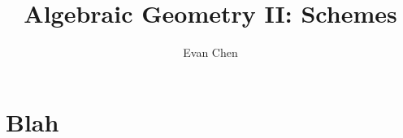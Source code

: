 \documentclass[11pt]{scrreprt}
\begin{document}
\title{Algebraic Geometry II: Schemes}
\author{Evan Chen}
\maketitle

\tableofcontents

\section{Blah}
\label{thm:reg_func_distinguish_open}
\label{ex:product_ring}
\end{document}

